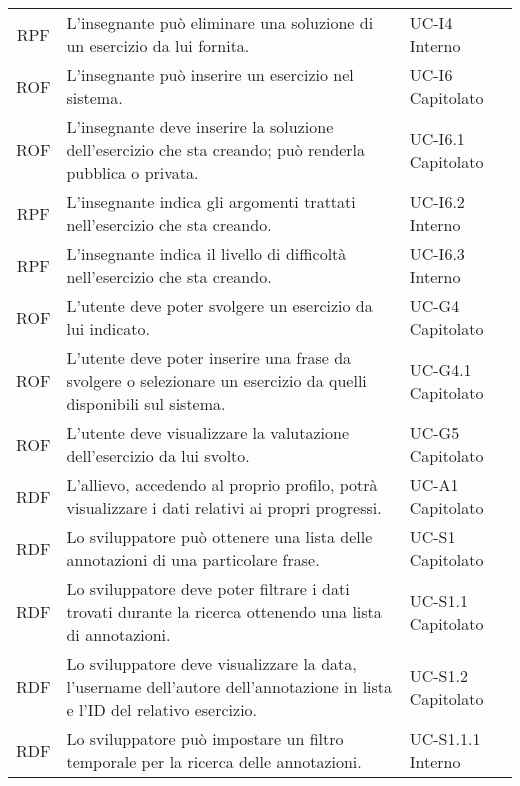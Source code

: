 \begin{tabularx}{\textwidth}{| c | p{10cm} | X |}
		RPF & L'insegnante può eliminare una soluzione di un esercizio da lui fornita. & UC-I4 \newline Interno\\
		ROF & L'insegnante può inserire un esercizio nel sistema. & UC-I6 \newline Capitolato\\
		ROF & L'insegnante deve inserire la soluzione dell'esercizio che sta creando; può renderla pubblica o privata. & UC-I6.1 \newline Capitolato\\
		RPF & L'insegnante indica gli argomenti trattati nell'esercizio che sta creando. & UC-I6.2 \newline Interno\\
		RPF & L'insegnante indica il livello di difficoltà nell'esercizio che sta creando. & UC-I6.3 \newline Interno\\
		ROF & L'utente deve poter svolgere un esercizio da lui indicato. & UC-G4 \newline Capitolato\\
		ROF & L'utente deve poter inserire una frase da svolgere o selezionare un esercizio da quelli disponibili sul sistema. & UC-G4.1 \newline Capitolato\\
		ROF & L'utente deve visualizzare la valutazione dell'esercizio da lui svolto. & UC-G5
		 \newline Capitolato\\
		RDF & L'allievo, accedendo al proprio profilo, potrà visualizzare i dati relativi ai propri progressi. & UC-A1 \newline Capitolato\\
		RDF & Lo sviluppatore può ottenere una lista delle annotazioni di una particolare frase. & UC-S1 \newline Capitolato\\
		RDF & Lo sviluppatore deve poter filtrare i dati trovati durante la ricerca ottenendo una lista di annotazioni. & UC-S1.1 \newline Capitolato\\
		RDF & Lo sviluppatore deve visualizzare la data, l'username dell'autore dell'annotazione in lista e l'ID del relativo esercizio. & UC-S1.2 \newline Capitolato\\
		RDF & Lo sviluppatore può impostare un filtro temporale per la ricerca delle annotazioni. & UC-S1.1.1 \newline Interno\\

\end{tabularx}
